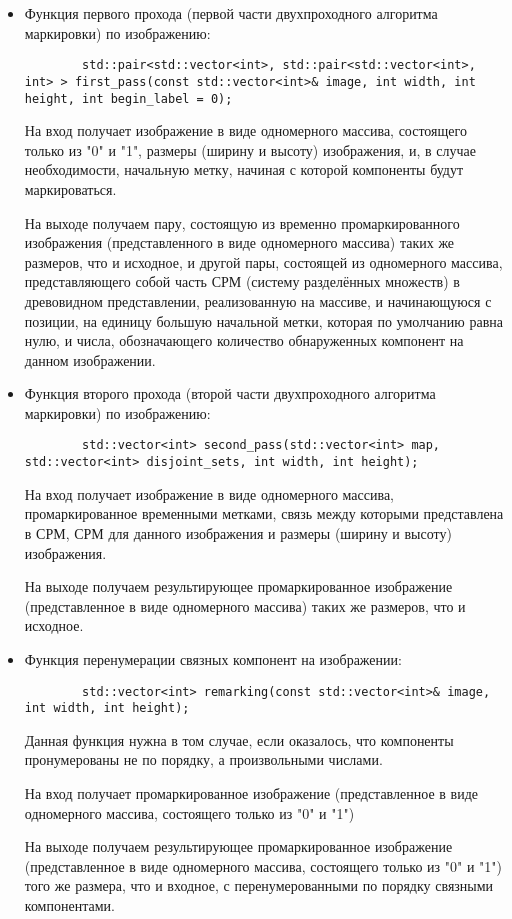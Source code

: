 \documentclass{report}
\begin{document}
\begin{itemize}
			\item Функция первого прохода (первой части двухпроходного алгоритма маркировки) по изображению:
			\begin{lstlisting}
		std::pair<std::vector<int>, std::pair<std::vector<int>, int> > first_pass(const std::vector<int>& image, int width, int height, int begin_label = 0);
			\end{lstlisting}
			\par На вход получает изображение в виде одномерного массива, состоящего только из "0"{} и "1"{}, размеры (ширину и высоту) изображения, и, в случае необходимости, начальную метку, начиная с которой компоненты будут маркироваться.
			\par На выходе получаем пару, состоящую из временно промаркированного изображения (представленного в виде одномерного массива) таких же размеров, что и исходное, и другой пары, состоящей из одномерного массива, представляющего собой часть СРМ (систему разделённых множеств) в древовидном представлении, реализованную на массиве, и начинающуюся с позиции, на единицу большую начальной метки, которая по умолчанию равна нулю, и числа, обозначающего количество обнаруженных компонент на данном изображении.

			\item Функция второго прохода (второй части двухпроходного алгоритма маркировки) по изображению:
			\begin{lstlisting}
		std::vector<int> second_pass(std::vector<int> map, std::vector<int> disjoint_sets, int width, int height);
			\end{lstlisting}
			\par На вход получает изображение в виде одномерного массива, промаркированное временными метками, связь между которыми представлена в СРМ, СРМ для данного изображения и размеры (ширину и высоту) изображения.
			\par На выходе получаем результирующее промаркированное изображение (представленное в виде одномерного массива) таких же размеров, что и исходное.

			\item Функция перенумерации связных компонент на изображении:
			\begin{lstlisting}
		std::vector<int> remarking(const std::vector<int>& image, int width, int height);
			\end{lstlisting}
			\par Данная функция нужна в том случае, если оказалось, что компоненты пронумерованы не по порядку, а произвольными числами.
			\par На вход получает промаркированное изображение (представленное в виде одномерного массива, состоящего только из "0"{} и "1"{})
			\par На выходе получаем результирующее промаркированное изображение (представленное в виде одномерного массива, состоящего только из "0"{} и "1"{}) того же размера, что и входное, с перенумерованными по порядку связными компонентами.
		\end{itemize}
	\newpage
\end{document}
